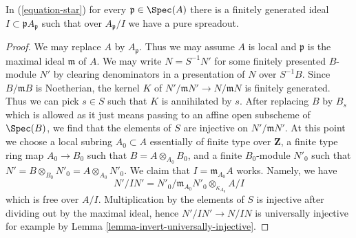 \begin{lemma}
\label{lemma-find-pure-spreadout}
In (\ref{equation-star}) for every $\mathfrak p \in \Spec(A)$
there is a finitely generated ideal $I \subset \mathfrak pA_\mathfrak p$
such that over $A_\mathfrak p/I$ we have a pure spreadout.
\end{lemma}

\begin{proof}
We may replace $A$ by $A_\mathfrak p$. Thus we may assume $A$ is
local and $\mathfrak p$ is the maximal ideal $\mathfrak m$ of $A$.
We may write $N = S^{-1}N'$ for some finitely presented $B$-module $N'$
by clearing denominators in a presentation of $N$ over $S^{-1}B$.
Since $B/\mathfrak m B$ is Noetherian, the kernel $K$ of
$N'/\mathfrak m N' \to N/\mathfrak m N$ is finitely generated.
Thus we can pick $s \in S$ such that $K$ is annihilated by $s$.
After replacing $B$ by $B_s$ which is allowed as it just means passing
to an affine open subscheme of $\Spec(B)$, we find that the elements of $S$
are injective on $N'/\mathfrak m N'$. At this point we choose
a local subring $A_0 \subset A$ essentially of finite type over $\mathbf{Z}$,
a finite type ring map $A_0 \to B_0$ such that $B = A \otimes_{A_0} B_0$,
and a finite $B_0$-module $N'_0$ such that
$N' = B \otimes_{B_0} N'_0 = A \otimes_{A_0} N'_0$.
We claim that $I = \mathfrak m_{A_0} A$ works.
Namely, we have
$$
N'/IN' = N'_0/\mathfrak m_{A_0} N'_0 \otimes_{\kappa_{A_0}} A/I
$$
which is free over $A/I$. Multiplication by the elements of $S$
is injective after dividing out by the maximal ideal, hence
$N'/IN' \to N/IN$ is universally injective for example by
Lemma \ref{lemma-invert-universally-injective}.
\end{proof}
